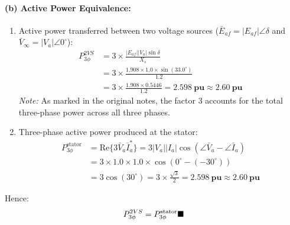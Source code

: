 \paragraph{(b) Active Power Equivalence:}
\begin{enumerate}
    \item Active power transferred between two voltage sources ($\bar{E}_{af} = |E_{af}|\angle \delta$ and $\bar{V}_\infty = |V_a|\angle 0^\circ$):
    \begin{align}
        P_{3\phi}^{2VS} &= 3 \times \frac{|E_{af}| |V_a| \sin\delta}{X_s} \nonumber\\
                        &= 3 \times \frac{1.908 \times 1.0 \times \sin(33.0^\circ)}{1.2} \nonumber\\
                        &= 3 \times \frac{1.908 \times 0.5446}{1.2} = \mathbf{2.598\ \text{pu} \approx 2.60\ \text{pu}}
    \end{align}
    \textit{Note:} As marked in the original notes, the factor $3$ accounts for the total three-phase power across all three phases.
    
    \item Three-phase active power produced at the stator:
    \begin{align}
        P_{3\phi}^{\text{stator}} &= \text{Re}\{3 \bar{V}_a \bar{I}_a^*\} = 3 |V_a| |I_a| \cos(\angle \bar{V}_a - \angle \bar{I}_a) \nonumber\\
                                  &= 3 \times 1.0 \times 1.0 \times \cos(0^\circ - (-30^\circ)) \nonumber\\
                                  &= 3 \cos(30^\circ) = 3 \times \frac{\sqrt{3}}{2} = \mathbf{2.598\ \text{pu} \approx 2.60\ \text{pu}}
    \end{align}
\end{enumerate}
Hence:
\begin{equation}
    P_{3\phi}^{2VS} = P_{3\phi}^{\text{stator}} \hfill \blacksquare
\end{equation}

